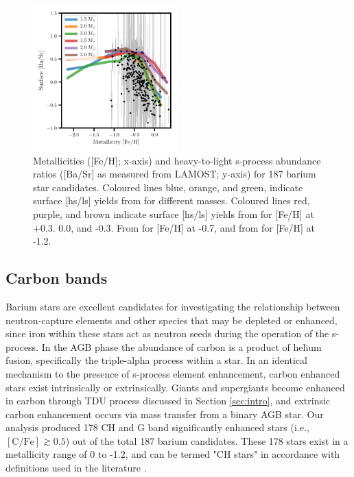 \documentclass[a4paper,fleqn,usenatbib]{mnras}
\begin{document}
\begin{figure}
	\includegraphics[width=0.5\textwidth]{yields_test.pdf}
    \caption{Metallicities ([Fe/H]; x-axis) and heavy-to-light s-process abundance ratios ([Ba/Sr] as measured from LAMOST; y-axis) for 187 barium star candidates. Coloured lines blue, orange, and green, indicate surface [hs/ls] yields from \citet{cristallo2015} for different masses. Coloured lines red, purple, and brown indicate surface [hs/ls] yields from \citet{karakas_lugaro2016} for [Fe/H] at +0.3. 0.0, and -0.3. From \citet{karakas2018} for [Fe/H] at -0.7, and from \citet{fishlock2014} for [Fe/H] at -1.2.}
    \label{fig:figure3}
\end{figure}

\subsection{Carbon bands}
Barium stars are excellent candidates for investigating the relationship between neutron-capture elements and other species that may be depleted or enhanced, since iron within these stars act as neutron seeds during the operation of the s-process. In the AGB phase the abundance of carbon is a product of helium fusion, specifically the triple-alpha process within a star. In an identical mechanism to the presence of s-process element enhancement, carbon enhanced stars exist intrinsically or extrinsically. Giants and supergiants become enhanced in carbon through TDU process discussed in Section \ref{sec:intro}, and extrinsic carbon enhancement occurs via mass transfer from a binary AGB star. Our analysis produced 178 CH and G band significantly enhanced stars (i.e., $[\textrm{C/Fe}] \gtrsim 0.5$) out of the total 187 barium candidates. These 178 stars exist in a metallicity range of 0 to -1.2, and can be termed "CH stars" in accordance with definitions used in the literature \citep[e.g.][]{luck1991, mcclure1997}.
\end{document}

